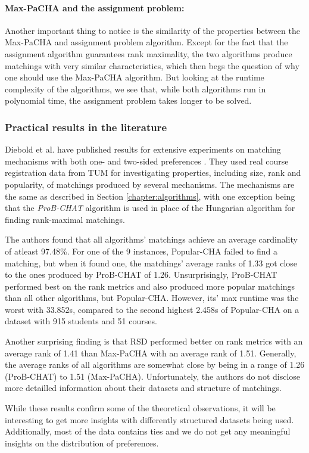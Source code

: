 \paragraph{Max-PaCHA and the assignment problem:}
Another important thing to notice is the similarity of the properties between the Max-PaCHA and assignment problem algorithm. Except for the fact that the assignment algorithm guarantees rank maximality, the two algorithms produce matchings with very similar characteristics, which then begs the question of why one should use the Max-PaCHA algorithm. But looking at the runtime complexity of the algorithms, we see that, while both algorithms run in polynomial time, the assignment problem takes longer to be solved.

\subsubsection{Practical results in the literature}\label{sec:practical-results-lit}
Diebold et al. have published results for extensive experiments on matching mechanisms with both one- and two-sided preferences \cite{DieboldBenchmark}. They used real course registration data from TUM for investigating properties, including size, rank and popularity, of matchings produced by several mechanisms. The mechanisms are the same as described in Section \ref{chapter:algorithms}, with one exception being that the \emph{ProB-CHAT} algorithm \cite{DieboldBenchmark} is used in place of the Hungarian algorithm for finding rank-maximal matchings.

The authors found that all algorithms' matchings achieve an average cardinality of atleast 97.48\%. For one of the 9 instances, Popular-CHA failed to find a matching, but when it found one, the matchings' average ranks of 1.33 got close to the ones produced by ProB-CHAT of 1.26. Unsurprisingly, ProB-CHAT performed best on the rank metrics and also produced more popular matchings than all other algorithms, but Popular-CHA. However, its' max runtime was the worst with 33.852s, compared to the second highest 2.458s of Popular-CHA on a dataset with 915 students and 51 courses.

Another surprising finding is that RSD performed better on rank metrics with an average rank of 1.41 than Max-PaCHA with an average rank of 1.51. Generally, the average ranks of all algorithms are somewhat close by being in a range of 1.26 (ProB-CHAT) to 1.51 (Max-PaCHA). Unfortunately, the authors do not disclose more detailled information about their datasets and structure of matchings. 

While these results confirm some of the theoretical observations, it will be interesting to get more insights with differently structured datasets being used. Additionally, most of the data contains ties and we do not get any meaningful insights on the distribution of preferences. 
